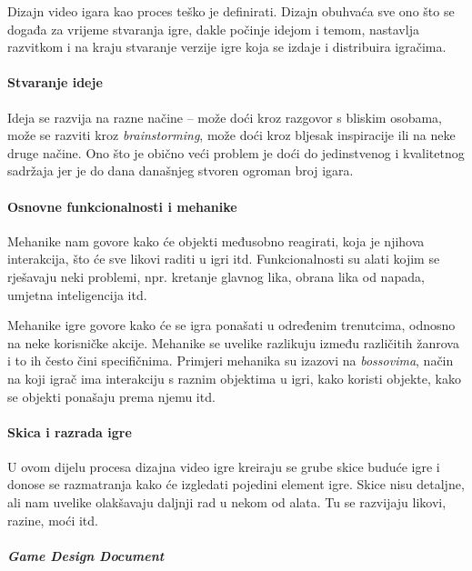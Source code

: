 \documentclass[a4paper,10pt]{article}
\begin{document}
Dizajn video igara kao proces teško je definirati. Dizajn obuhvaća sve ono što
se događa za vrijeme stvaranja igre, dakle počinje idejom i temom, nastavlja
razvitkom i na kraju stvaranje verzije igre koja se izdaje i distribuira
igračima.

\paragraph{Stvaranje ideje}

Ideja se razvija na razne načine -- može doći kroz razgovor s bliskim osobama,
može se razviti kroz \textit{brainstorming}, može doći kroz bljesak
inspiracije ili na neke druge načine. Ono što je obično veći problem je doći do
jedinstvenog i kvalitetnog sadržaja jer je do dana današnjeg stvoren ogroman
broj igara.

\paragraph{Osnovne funkcionalnosti i mehanike}

Mehanike nam govore kako će objekti međusobno
reagirati, koja je njihova interakcija, što će sve likovi raditi u igri itd.
Funkcionalnosti su alati kojim se rješavaju neki problemi, npr. kretanje
glavnog lika, obrana lika od napada, umjetna inteligencija itd.

Mehanike igre govore kako će se igra ponašati u određenim trenutcima, odnosno
na neke korisničke akcije.  Mehanike se uvelike razlikuju između različitih
žanrova i to ih često čini specifičnima. Primjeri mehanika su izazovi na
\textit{bossovima}, način na koji igrač ima interakciju s raznim objektima u
igri, kako koristi objekte, kako se objekti ponašaju prema njemu itd.

\paragraph{Skica i razrada igre}

U ovom dijelu procesa dizajna video igre kreiraju se grube skice buduće igre i
donose se razmatranja kako će izgledati pojedini element igre. Skice nisu
detaljne, ali nam uvelike olakšavaju daljnji rad u nekom od alata. Tu se
razvijaju likovi, razine, moći itd.

\paragraph{\textit{Game Design Document}}
\end{document}
